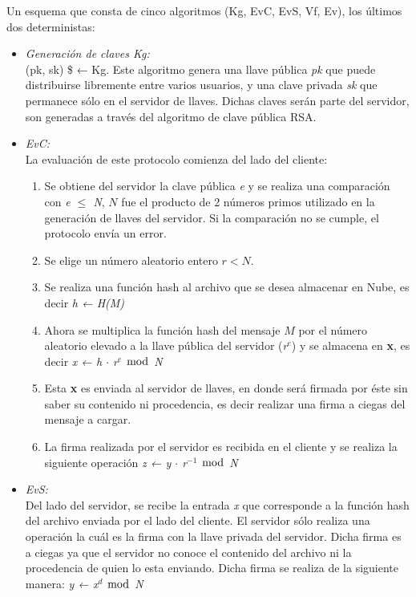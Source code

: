 Un esquema que consta de cinco algoritmos (Kg, EvC, EvS, Vf, Ev), los últimos dos deterministas: 

\begin{itemize}
	\item \textit{Generación de claves Kg: } \\
	 (pk, sk) \$ ← Kg. Este algoritmo genera una llave pública \textit{pk} que puede distribuirse libremente entre varios usuarios, y una clave privada \textit{sk} que permanece sólo en el servidor de llaves. Dichas claves serán parte del servidor, son generadas a través del algoritmo de clave pública RSA.


	\item \textit{EvC: }\\ 
	La evaluación de este protocolo comienza del lado del cliente: 
	\begin {enumerate}
		\item Se obtiene del servidor la clave pública \textit{e} y se realiza una comparación con  \textit{e $\leq$ N}, $N$ fue el producto de 2 números primos utilizado en la generación de llaves del servidor. Si la comparación no se cumple, el protocolo envía un error.
		\item Se elige un número aleatorio entero $r<N$.
		\item Se realiza una función hash al archivo que se desea almacenar en Nube, es decir \textit{h ← H(M)} 
		\item Ahora se multiplica la función hash del mensaje $M$ por el número aleatorio elevado a la llave pública del servidor (\textit{r$^e$}) y se almacena en \textbf{x}, es decir \textit{x ← h $\cdot$ r$^e$ $\bmod$ N}
		\item Esta \textbf{x} es enviada al servidor de llaves, en donde será firmada por éste sin saber su contenido ni procedencia, es decir realizar una firma a ciegas del mensaje a cargar.
		\item La firma realizada por el servidor es recibida en el cliente y se realiza la siguiente operación  \hspace{2cm} \textit{z ← y $\cdot$ r$^{-1}$ $\bmod$ N}


\end{enumerate}
\item \textit{EvS: }\\ 
Del lado del servidor, se recibe la entrada \textit{x} que corresponde a la función hash del archivo enviada por el lado del cliente. El servidor sólo realiza una operación la cuál es la firma con la llave privada del servidor. Dicha firma es a ciegas ya que el servidor no conoce el contenido del archivo ni la procedencia de quien lo esta enviando. Dicha firma se realiza de la siguiente manera:    \hspace{2cm} \textit{y ← x$^d$ $\bmod$ N}



\end{itemize}
